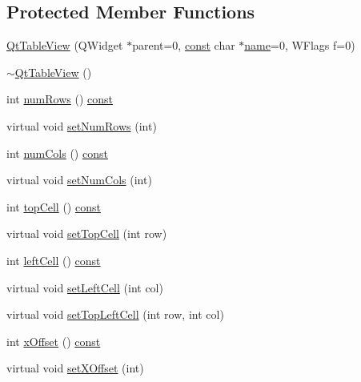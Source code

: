 \subsection*{Protected Member Functions}
\begin{DoxyCompactItemize}
\item 
\hyperlink{classQtTableView_ab4805938967bedf4acfe9a92ccddeafd}{Qt\+Table\+View} (Q\+Widget $\ast$parent=0, \hyperlink{tradstdc_8h_a2c212835823e3c54a8ab6d95c652660e}{const} char $\ast$\hyperlink{lev__main_8c_a8f8f80d37794cde9472343e4487ba3eb}{name}=0, W\+Flags f=0)
\item 
\hyperlink{classQtTableView_ac0d0f16e5632634b960e6f8035579c50}{$\sim$\+Qt\+Table\+View} ()
\item 
int \hyperlink{classQtTableView_a0017c9c5d5b98b4dc065240dde826a71}{num\+Rows} () \hyperlink{tradstdc_8h_a2c212835823e3c54a8ab6d95c652660e}{const} 
\item 
virtual void \hyperlink{classQtTableView_ac2752a0098da12420a4fb35cd275ae5f}{set\+Num\+Rows} (int)
\item 
int \hyperlink{classQtTableView_af892830938a8cd559886484cc7d4e9b0}{num\+Cols} () \hyperlink{tradstdc_8h_a2c212835823e3c54a8ab6d95c652660e}{const} 
\item 
virtual void \hyperlink{classQtTableView_a5464a8de63d6324025db162344e3cf58}{set\+Num\+Cols} (int)
\item 
int \hyperlink{classQtTableView_a5a5f45a633b8d46e35bef7f06403abf8}{top\+Cell} () \hyperlink{tradstdc_8h_a2c212835823e3c54a8ab6d95c652660e}{const} 
\item 
virtual void \hyperlink{classQtTableView_a8859dc46619dd41fed7f19e41f1343b2}{set\+Top\+Cell} (int row)
\item 
int \hyperlink{classQtTableView_aef2e96694049f4187d77103bb5c23ab7}{left\+Cell} () \hyperlink{tradstdc_8h_a2c212835823e3c54a8ab6d95c652660e}{const} 
\item 
virtual void \hyperlink{classQtTableView_a1a19e28fe815c1568e11fc962e78e5b4}{set\+Left\+Cell} (int col)
\item 
virtual void \hyperlink{classQtTableView_a7c73d229fd7d86a486a8fbe671db8354}{set\+Top\+Left\+Cell} (int row, int col)
\item 
int \hyperlink{classQtTableView_a80495b1146d9f99d7077d3b20d787f87}{x\+Offset} () \hyperlink{tradstdc_8h_a2c212835823e3c54a8ab6d95c652660e}{const} 
\item 
virtual void \hyperlink{classQtTableView_a4d76cadf8d4d3c80b12ea77bc703035a}{set\+X\+Offset} (int)
\item 

\end{DoxyCompactItemize}
